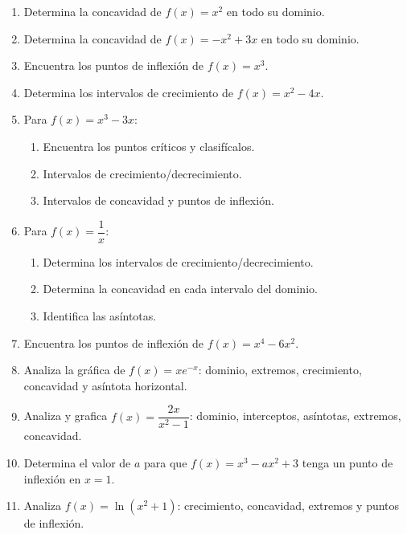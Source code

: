\documentclass[12pt, a4paper]{article}
\begin{document}
\begin{enumerate}[leftmargin=*, resume]
  \item \facil{} Determina la concavidad de $f(x) = x^2$ en todo su dominio.

  \item \facil{} Determina la concavidad de $f(x) = -x^2 + 3x$ en todo su dominio.

  \item \facil{} Encuentra los puntos de inflexión de $f(x) = x^3$.

  \item \facil{} Determina los intervalos de crecimiento de $f(x) = x^2 - 4x$.

  \item \medio{} Para $f(x) = x^3 - 3x$:
        \begin{enumerate}[label=\alph*)]
          \item Encuentra los puntos críticos y clasifícalos.
          \item Intervalos de crecimiento/decrecimiento.
          \item Intervalos de concavidad y puntos de inflexión.
        \end{enumerate}

  \item \medio{} Para $f(x) = \dfrac{1}{x}$:
        \begin{enumerate}[label=\alph*)]
          \item Determina los intervalos de crecimiento/decrecimiento.
          \item Determina la concavidad en cada intervalo del dominio.
          \item Identifica las asíntotas.
        \end{enumerate}

  \item \medio{} Encuentra los puntos de inflexión de $f(x) = x^4 - 6x^2$.

  \item \medio{} Analiza la gráfica de $f(x) = x e^{-x}$: dominio, extremos, crecimiento, concavidad y asíntota horizontal.

  \item \dificil{} Analiza y grafica $f(x) = \dfrac{2x}{x^2 - 1}$: dominio, interceptos, asíntotas, extremos, concavidad.

  \item \dificil{} Determina el valor de $a$ para que $f(x) = x^3 - ax^2 + 3$ tenga un punto de inflexión en $x = 1$.

  \item \dificil{} Analiza $f(x) = \ln(x^2 + 1)$: crecimiento, concavidad, extremos y puntos de inflexión.
\end{enumerate}
\end{document}
